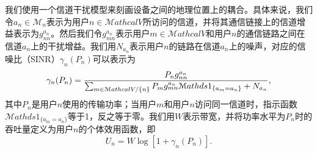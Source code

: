 我们使用一个信道干扰模型来刻画设备之间的地理位置上的耦合。具体来说，我们令$a_n\in\mathcal{M}_n$表示为用户$n\in\mathcal{M}athcal{V}$所访问的信道，并将其通信链接上的信道增益表示为$g_{nn}^{a_n}$。然后我们令$g_{mn}^{a_n}$表示用户$m\in\mathcal{M}athcal{V}$和用户$n$的通信链路之间在信道$a_n$上的干扰增益。我们用$N_{a_n}$表示用户$n$的链路在信道$a_n$上的噪声，对应的信噪比（SINR）$\gamma_n(P_n)$可以表示为
\begin{equation}
\small
\gamma_n(P_n)=\frac{P_{n}g_{nn}^{a_n}}{\sum_{m\in \mathcal{M}athcal{V}/\{n\}}P_{m}g_{mn}^{a_n}\mathcal{M}athds{1}_{\{a_m=a_n\}}+N_{a_n}},
\end{equation}
其中$P_n$是用户$n$使用的传输功率；当用户$m$和用户$n$访问同一信道时，指示函数$\mathcal{M}athds{1}_{\{a_m = a_n\}}$等于1，反之等于零。我们用$W$表示带宽，并将功率水平为$P_n$时的吞吐量定义为用户$n$的个体效用函数，即
\vspace{-0.2cm}
\begin{equation}\label{indiu}
U_n=W\log[1+\gamma_n(P_n)].
\end{equation}


